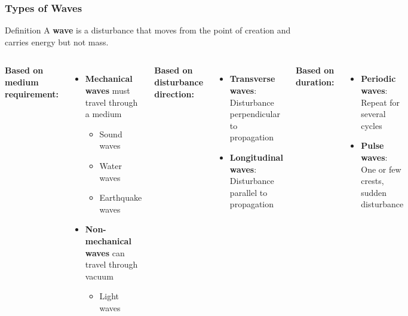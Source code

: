 \documentclass{beamer}
\begin{document}
\begin{frame}
\frametitle{Types of Waves}
\begin{block}{Definition}
A \textbf{wave} is a disturbance that moves from the point of creation and carries energy but not mass.
\end{block}

\begin{columns}
\textbf{Based on medium requirement:}
\begin{itemize}
\item \textbf{Mechanical waves} must travel through a medium
\begin{itemize}
\item Sound waves
\item Water waves
\item Earthquake waves
\end{itemize}
\item \textbf{Non-mechanical waves} can travel through vacuum
\begin{itemize}
\item Light waves
\end{itemize}
\end{itemize}

\textbf{Based on disturbance direction:}
\begin{itemize}
\item \textbf{Transverse waves}: Disturbance perpendicular to propagation
\item \textbf{Longitudinal waves}: Disturbance parallel to propagation
\end{itemize}

\textbf{Based on duration:}
\begin{itemize}
\item \textbf{Periodic waves}: Repeat for several cycles
\item \textbf{Pulse waves}: One or few crests, sudden disturbance
\end{itemize}
\end{columns}
\end{frame}
\end{document}
